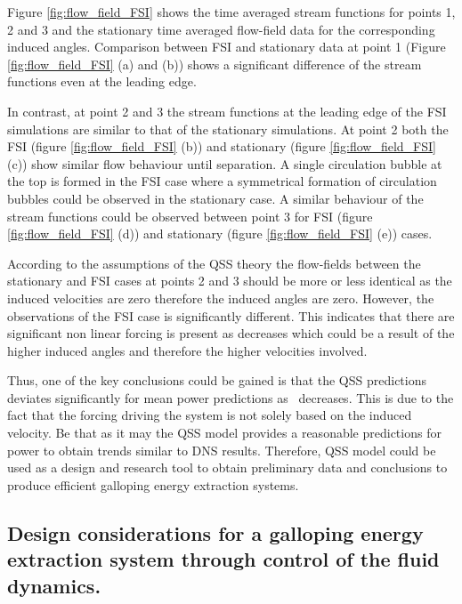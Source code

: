

Figure \ref{fig:flow_field_FSI} shows the time averaged stream functions for points 1, 2 and 3 and the stationary time averaged flow-field data for the corresponding induced angles. Comparison between FSI and stationary data at point 1 (Figure \ref{fig:flow_field_FSI} (a) and (b)) shows a significant difference of the stream functions even at the leading edge.

In contrast, at point 2 and 3 the stream functions at the leading edge of the FSI simulations are similar to that of the stationary simulations. At point 2 both the FSI (figure \ref{fig:flow_field_FSI} (b)) and stationary (figure \ref{fig:flow_field_FSI} (c)) show similar flow behaviour until separation. A single circulation bubble at the top is formed in the FSI case where a symmetrical formation of circulation bubbles could be observed in the stationary case. A similar behaviour of the stream functions could be observed between point 3 for FSI (figure \ref{fig:flow_field_FSI} (d)) and stationary (figure \ref{fig:flow_field_FSI} (e)) cases. 

According to the assumptions of the QSS theory the flow-fields between the stationary and FSI cases at points 2 and 3 should be more or less identical as the induced velocities are zero therefore the induced angles are zero. However, the observations of the FSI case is significantly different. This indicates that there are significant non linear forcing is present as \ratio decreases which could be a result of the higher induced angles and therefore the higher velocities involved. 

Thus, one of the key conclusions could be gained is that the QSS predictions deviates significantly for mean power predictions as \ratio\ decreases. This is due to the fact that the forcing driving the system is not solely based on the induced velocity. Be that as it may the QSS model provides a reasonable predictions for power to obtain trends similar to DNS results. Therefore, QSS model could be used as a design and research tool to obtain preliminary data and conclusions to produce efficient galloping energy extraction systems. 

\subsection{Design considerations for a galloping energy extraction system through control of the fluid dynamics.}
\label{subsec:design-considerations-cross-section}
  
